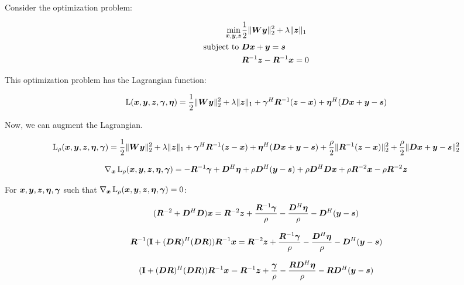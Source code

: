 \documentclass{article}
\begin{document}
Consider the optimization problem:

\begin{equation}
\begin{aligned}
\min_{\bm{x},\bm{y},\bm{z}} & \frac{1}{2}\|\bm{W}\bm{y}\|_2^2 + \lambda\|\bm{z}\|_1 \\
\text{subject to } & \bm{D}\bm{x} + \bm{y} = \bm{s} \\
                   &  \bm{R}^{-1}\bm{z} - \bm{R}^{-1}\bm{x} = 0
\end{aligned}
\end{equation}

This optimization problem has the Lagrangian function:

\begin{equation}
\operatorname{L}(\bm{x},\bm{y},\bm{z},\bm{\gamma},\bm{\eta}) = \frac{1}{2}\|\bm{W}\bm{y}\|_2^2 + \lambda\|\bm{z}\|_1 + \bm{\gamma}^H\bm{R}^{-1}(\bm{z} - \bm{x}) + \bm{\eta}^H(\bm{D}\bm{x} + \bm{y} - \bm{s})
\end{equation}

Now, we can augment the Lagrangian.

\begin{equation}
\operatorname{L}_{\rho}(\bm{x},\bm{y},\bm{z},\bm{\eta},\bm{\gamma}) = \frac{1}{2}\|\bm{W}\bm{y}\|_2^2 + \lambda\|\bm{z}\|_1 + \bm{\gamma}^H\bm{R}^{-1}(\bm{z} - \bm{x}) + \bm{\eta}^H(\bm{D}\bm{x} + \bm{y} - \bm{s}) + \frac{\rho}{2}\|\bm{R}^{-1}(\bm{z} - \bm{x})\|_2^2 + \frac{\rho}{2}\|\bm{D}\bm{x} + \bm{y} - \bm{s}\|_2^2
\end{equation} 

\begin{equation}
\nabla_{\bm{x}}\operatorname{L}_{\rho}(\bm{x},\bm{y},\bm{z},\bm{\eta},\bm{\gamma}) = -\bm{R}^{-1}\bm{\gamma} + \bm{D}^H\bm{\eta} + \rho\bm{D}^H(\bm{y} - \bm{s}) + \rho\bm{D}^H\bm{D}\bm{x} + \rho\bm{R}^{-2}\bm{x} - \rho\bm{R}^{-2}\bm{z}
\end{equation}

For $\bm{x},\bm{y},\bm{z},\bm{\eta},\bm{\gamma}$ such that $\nabla_{\bm{x}}\operatorname{L}_{\rho}(\bm{x},\bm{y},\bm{z},\bm{\eta},\bm{\gamma}) = 0$:

\begin{equation}
(\bm{R}^{-2} + \bm{D}^H\bm{D})\bm{x} = \bm{R}^{-2}\bm{z} + \frac{\bm{R}^{-1} \bm{\gamma}}{\rho} - \frac{\bm{D}^H\bm{\eta}}{\rho} - \bm{D}^H(\bm{y} - \bm{s})
\end{equation}

\begin{equation}
\bm{R}^{-1}({\bf I} + (\bm{D}\bm{R})^H(\bm{D}\bm{R}))\bm{R}^{-1}\bm{x} = \bm{R}^{-2}\bm{z} + \frac{\bm{R}^{-1} \bm{\gamma}}{\rho} - \frac{\bm{D}^H\bm{\eta}}{\rho} - \bm{D}^H(\bm{y} - \bm{s})
\end{equation}

\begin{equation}
({\bf I} + (\bm{D}\bm{R})^H(\bm{D}\bm{R}))\bm{R}^{-1}\bm{x} = \bm{R}^{-1}\bm{z} + \frac{\bm{\gamma}}{\rho} - \frac{\bm{R}\bm{D}^H\bm{\eta}}{\rho} - \bm{R}\bm{D}^H(\bm{y} - \bm{s})
\end{equation}
\end{document}
